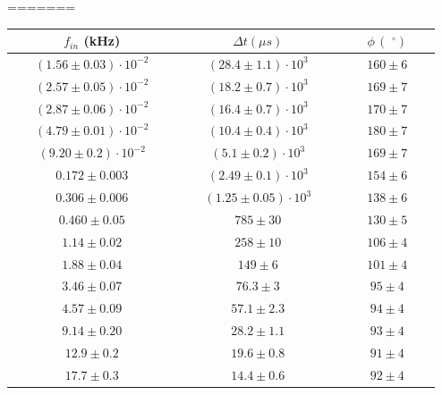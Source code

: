 \documentclass[10pt,a4paper]{article}
\newcommand{\exn}{\phantom{xxx}}
\begin{document}
\begin{table}[h]
=======
			\begin{tabular}{|c|c|c|}
				\hline
				$f_{in}$ (kHz)  & $\Delta t (\mu s)$ & $\phi \,(\,\,^\circ)$ \\
				\hline


				$\exn(1.56 \pm0.03)\cdot 10^{-2} \exn $& $\exn (28.4\pm 1.1)\cdot 10^3  \exn $ & $\exn160 \pm6\exn $ \\
				\hline
				$\exn( 2.57\pm0.05)\cdot 10^{-2} \exn $ &$\exn (18.2\pm 0.7)\cdot 10^3  \exn $ & $\exn169 \pm 7 \exn $ \\

					
				\hline
				$\exn(2.87 \pm0.06)\cdot 10^{-2} \exn $  & $\exn(16.4 \pm   0.7)\cdot 10^3 \exn $ & $\exn 170\pm 7\exn $ \\

				\hline
				$\exn (4.79\pm0.01)\cdot 10^{-2} \exn $ & $\exn(10.4 \pm 0.4)\cdot 10^3 \exn $ & $\exn 180\pm 7 \exn $ \\
				
				\hline
				$\exn (9.20\pm 0.2)\cdot 10^{-2}\exn $  & $\exn (5.1\pm 0.2)\cdot 10^3 \exn $ & $\exn169\pm7\exn $ \\
				\hline

				$\exn0.172 \pm0.003 \exn $  & $\exn (2.49\pm   0.1)\cdot 10^3   \exn $ & $\exn 154\pm6 \exn $ \\
				\hline
				$\exn0.306 \pm0.006 \exn $  & $\exn (1.25 \pm 0.05)\cdot 10^3  \exn $ & $\exn138 \pm 6\exn $ \\
				\hline
				
				
				
				$\exn 0.460\pm0.05 \exn $& $\exn785 \pm 30 \exn $ & $\exn130 \pm5  \exn $ \\
				\hline
				$\exn 1.14\pm 0.02\exn $  & $\exn258 \pm  10  \exn $ & $\exn106 \pm 4\exn $ \\
				\hline
				$\exn 1.88\pm0.04 \exn $  & $\exn 149 \pm  6 \exn $ & $\exn101 \pm 4 \exn $ \\
				\hline
				$\exn 3.46\pm 0.07 \exn $  & $\exn 76.3 \pm3
   \exn $ & $\exn95 \pm 4\exn $ \\
				\hline
				$\exn4.57 \pm0.09 \exn $  & $\exn 57.1 \pm  2.3    \exn $ & $\exn94 \pm4\exn $ \\
				\hline

				$\exn 9.14\pm 0.20\exn $ & $\exn28.2 \pm 1.1   \exn $ & $\exn 93 \pm 4 \exn $ \\
				\hline

				$\exn 12.9\pm 0.2 \exn $  & $\exn 19.6 \pm 0.8 \exn $ & $\exn 91 \pm  4\exn $ \\
				\hline
				$\exn 17.7\pm 0.3\exn $ & $\exn14.4\pm 0.6 \exn $ & $\exn 92\pm4\exn $ \\


\end{tabular}
\end{table}
\end{document}
